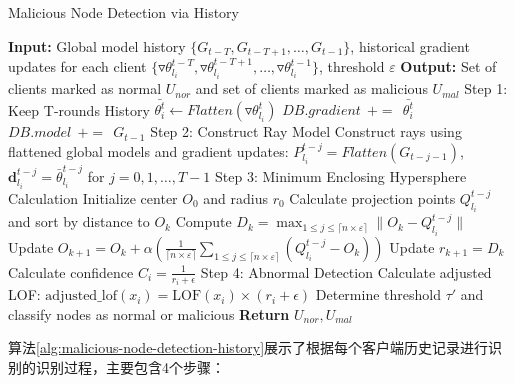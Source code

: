 \documentclass[lettersize,journal]{IEEEtran}
\begin{document}
\begin{algorithm}
\caption{Malicious Node Detection via History}
\label{alg:malicious-node-detection-history}
\begin{algorithmic}[1]
\State \textbf{Input:} Global model history $\{G_{t-T}, G_{t-T+1}, \dots, G_{t-1}\}$, historical gradient updates for each client $\{\triangledown \theta_{l_i}^{t-T}, \triangledown \theta_{l_i}^{t-T+1}, \dots, \triangledown \theta_{l_i}^{t-1}\}$, threshold $\varepsilon$
\State \textbf{Output:} Set of clients marked as normal $U_{nor}$ and set of clients marked as malicious $U_{mal}$
\State Step 1: Keep T-rounds History
    \State $\bar{\theta_i^t} \gets Flatten(\triangledown \theta_{l_i}^t)$
    \State $DB.gradient\ \ +=\ \ \bar{\theta_i^t}$
    \State $DB.model\ \ +=\ \ G_{t-1}$
\EndFor
\State Step 2: Construct Ray Model
    \State Construct rays using flattened global models and gradient updates:
    \State $P_{l_i}^{t-j} = Flatten(G_{t-j-1})$, $\mathbf{d}_{l_i}^{t-j} = \bar{\theta}_{l_i}^{t-j}$ for $j = 0, 1, \ldots, T-1$
\EndFor
\State Step 3: Minimum Enclosing Hypersphere Calculation
    \State Initialize center $O_0$ and radius $r_0$
        \State Calculate projection points $Q_{l_i}^{t-j}$ and sort by distance to $O_k$
        \State Compute $D_k = \max_{1\leq j\leq \lceil n\times \varepsilon\rceil} \|O_k - Q_{l_i}^{t-j}\|$
        \State Update $O_{k+1} = O_k + \alpha \left(\frac{1}{\lceil n\times \varepsilon\rceil} \sum_{1\leq j\leq \lceil n\times \varepsilon\rceil} (Q_{l_i}^{t-j} - O_k)\right)$
        \State Update $r_{k+1} = D_k$
    \EndWhile
    \State Calculate confidence $C_i = \frac{1}{r_i + \epsilon}$
\EndFor
\State Step 4: Abnormal Detection
    \State Calculate adjusted LOF: $\text{adjusted\_lof}(x_i) = \text{LOF}(x_i) \times (r_i + \epsilon)$
    \State Determine threshold $\tau'$ and classify nodes as normal or malicious
\EndFor
\State \textbf{Return} $U_{nor}, U_{mal}$
\end{algorithmic}
\end{algorithm}

算法\ref{alg:malicious-node-detection-history}展示了根据每个客户端历史记录进行识别的识别过程，主要包含4个步骤：
\end{document}
